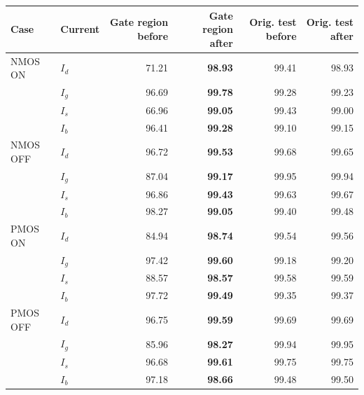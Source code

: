 \begin{tabular}{llrrrr}
\hline
Case & Current & Gate region before & Gate region after & Orig. test before & Orig. test after \\
\hline
NMOS ON & $I_{d}$ & 71.21 & \textbf{98.93} & 99.41 & 98.93 \\
 & $I_{g}$ & 96.69 & \textbf{99.78} & 99.28 & 99.23 \\
 & $I_{s}$ & 66.96 & \textbf{99.05} & 99.43 & 99.00 \\
 & $I_{b}$ & 96.41 & \textbf{99.28} & 99.10 & 99.15 \\
NMOS OFF & $I_{d}$ & 96.72 & \textbf{99.53} & 99.68 & 99.65 \\
 & $I_{g}$ & 87.04 & \textbf{99.17} & 99.95 & 99.94 \\
 & $I_{s}$ & 96.86 & \textbf{99.43} & 99.63 & 99.67 \\
 & $I_{b}$ & 98.27 & \textbf{99.05} & 99.40 & 99.48 \\
PMOS ON & $I_{d}$ & 84.94 & \textbf{98.74} & 99.54 & 99.56 \\
 & $I_{g}$ & 97.42 & \textbf{99.60} & 99.18 & 99.20 \\
 & $I_{s}$ & 88.57 & \textbf{98.57} & 99.58 & 99.59 \\
 & $I_{b}$ & 97.72 & \textbf{99.49} & 99.35 & 99.37 \\
PMOS OFF & $I_{d}$ & 96.75 & \textbf{99.59} & 99.69 & 99.69 \\
 & $I_{g}$ & 85.96 & \textbf{98.27} & 99.94 & 99.95 \\
 & $I_{s}$ & 96.68 & \textbf{99.61} & 99.75 & 99.75 \\
 & $I_{b}$ & 97.18 & \textbf{98.66} & 99.48 & 99.50 \\
\hline
\end{tabular}
